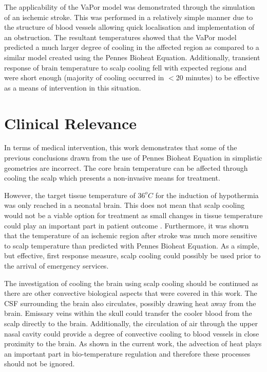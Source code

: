 \documentclass[11pt,english,a4paper,twoside,openright]{report}
\begin{document}
{{{{{{{The applicability of the VaPor model was demonstrated through the simulation of an ischemic stroke. This was performed in a relatively simple manner due to the structure of blood vessels allowing quick localisation and implementation of an obstruction. The resultant temperatures showed that the VaPor model predicted a much larger degree of cooling in the affected region as compared to a similar model created using the Pennes Bioheat Equation. Additionally, transient response of brain temperature to scalp cooling fell with expected regions and were short enough (majority of cooling occurred in {$<$}20 minutes) to be effective as a means of intervention in this situation. 

\section[Clinical Relevance]{{\Large C}linical {\Large R}elevance}

In terms of medical intervention, this work demonstrates that some of the previous conclusions drawn from the use of Pennes Bioheat Equation in simplistic geometries are incorrect. The core brain temperature can be affected through cooling the scalp which presents a non-invasive means for treatment. 

However, the target tissue temperature of $36^{o}C$ for the induction of hypothermia was only reached in a neonatal brain. This does not mean that scalp cooling would not be a viable option for treatment as small changes in tissue temperature could play an important part in patient outcome \cite{mariak2002intracranial}. Furthermore, it was shown that the temperature of an ischemic region after stroke was much more sensitive to scalp temperature than predicted with Pennes Bioheat Equation. As a simple, but effective, first response measure, scalp cooling could possibly be used prior to the arrival of emergency services.

The investigation of cooling the brain using scalp cooling should be continued as there are other convective biological aspects that were covered in this work. The CSF surrounding the brain also circulates, possibly drawing heat away from the brain. Emissary veins within the skull could transfer the cooler blood from the scalp directly to the brain. Additionally, the circulation of air through the upper nasal cavity could provide a degree of convective cooling to blood vessels in close proximity to the brain. As shown in the current work, the advection of heat plays an important part in bio-temperature regulation and therefore these processes should not be ignored.

}}}}}}}
\end{document}
